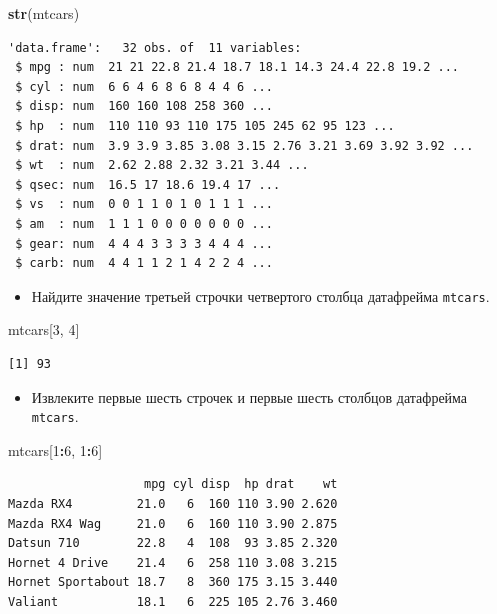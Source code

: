 \documentclass[
]{book}
\newenvironment{Shaded}{\begin{snugshade}}{\end{snugshade}}
\newcommand{\DecValTok}[1]{\textcolor[rgb]{0.00,0.00,0.81}{#1}}
\newcommand{\KeywordTok}[1]{\textcolor[rgb]{0.13,0.29,0.53}{\textbf{#1}}}
\newcommand{\NormalTok}[1]{#1}
\newcommand{\OperatorTok}[1]{\textcolor[rgb]{0.81,0.36,0.00}{\textbf{#1}}}
\providecommand{\tightlist}{%
  \setlength{\itemsep}{0pt}\setlength{\parskip}{0pt}}
\begin{document}
\begin{Shaded}
\begin{Highlighting}[]
\KeywordTok{str}\NormalTok{(mtcars)}
\end{Highlighting}
\end{Shaded}

\begin{verbatim}
'data.frame':   32 obs. of  11 variables:
 $ mpg : num  21 21 22.8 21.4 18.7 18.1 14.3 24.4 22.8 19.2 ...
 $ cyl : num  6 6 4 6 8 6 8 4 4 6 ...
 $ disp: num  160 160 108 258 360 ...
 $ hp  : num  110 110 93 110 175 105 245 62 95 123 ...
 $ drat: num  3.9 3.9 3.85 3.08 3.15 2.76 3.21 3.69 3.92 3.92 ...
 $ wt  : num  2.62 2.88 2.32 3.21 3.44 ...
 $ qsec: num  16.5 17 18.6 19.4 17 ...
 $ vs  : num  0 0 1 1 0 1 0 1 1 1 ...
 $ am  : num  1 1 1 0 0 0 0 0 0 0 ...
 $ gear: num  4 4 4 3 3 3 3 4 4 4 ...
 $ carb: num  4 4 1 1 2 1 4 2 2 4 ...
\end{verbatim}

\begin{itemize}
\tightlist
\item
  Найдите значение третьей строчки четвертого столбца датафрейма \texttt{mtcars}.
\end{itemize}

\begin{Shaded}
\begin{Highlighting}[]
\NormalTok{mtcars[}\DecValTok{3}\NormalTok{, }\DecValTok{4}\NormalTok{]}
\end{Highlighting}
\end{Shaded}

\begin{verbatim}
[1] 93
\end{verbatim}

\begin{itemize}
\tightlist
\item
  Извлеките первые шесть строчек и первые шесть столбцов датафрейма \texttt{mtcars}.
\end{itemize}

\begin{Shaded}
\begin{Highlighting}[]
\NormalTok{mtcars[}\DecValTok{1}\OperatorTok{:}\DecValTok{6}\NormalTok{, }\DecValTok{1}\OperatorTok{:}\DecValTok{6}\NormalTok{]}
\end{Highlighting}
\end{Shaded}

\begin{verbatim}
                   mpg cyl disp  hp drat    wt
Mazda RX4         21.0   6  160 110 3.90 2.620
Mazda RX4 Wag     21.0   6  160 110 3.90 2.875
Datsun 710        22.8   4  108  93 3.85 2.320
Hornet 4 Drive    21.4   6  258 110 3.08 3.215
Hornet Sportabout 18.7   8  360 175 3.15 3.440
Valiant           18.1   6  225 105 2.76 3.460
\end{verbatim}
\end{document}
